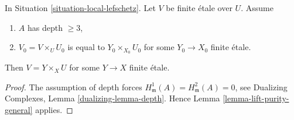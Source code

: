 \begin{lemma}
\label{lemma-lift-purity}
In Situation \ref{situation-local-lefschetz}.
Let $V$ be finite \'etale over $U$. Assume
\begin{enumerate}
\item $A$ has depth $\geq 3$,
\item $V_0 = V \times_U U_0$ is equal to $Y_0 \times_{X_0} U_0$
for some $Y_0 \to X_0$ finite \'etale.
\end{enumerate}
Then $V = Y \times_X U$ for some $Y \to X$ finite \'etale.
\end{lemma}

\begin{proof}
The assumption of depth forces
$H^1_\mathfrak m(A) = H^2_\mathfrak m(A) = 0$, see
Dualizing Complexes, Lemma \ref{dualizing-lemma-depth}.
Hence Lemma \ref{lemma-lift-purity-general} applies.
\end{proof}
